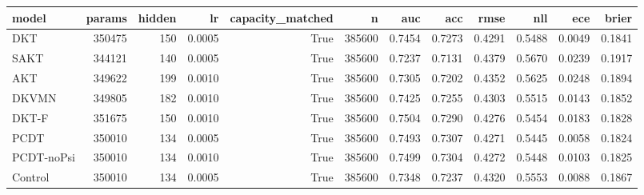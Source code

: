 \begin{tabular}{lrrrrrrrrrrr}
\toprule
model & params & hidden & lr & capacity\_matched & n & auc & acc & rmse & nll & ece & brier \\
\midrule
DKT & 350475 & 150 & 0.0005 & True & 385600 & 0.7454 & 0.7273 & 0.4291 & 0.5488 & 0.0049 & 0.1841 \\
SAKT & 344121 & 140 & 0.0005 & True & 385600 & 0.7237 & 0.7131 & 0.4379 & 0.5670 & 0.0239 & 0.1917 \\
AKT & 349622 & 199 & 0.0010 & True & 385600 & 0.7305 & 0.7202 & 0.4352 & 0.5625 & 0.0248 & 0.1894 \\
DKVMN & 349805 & 182 & 0.0010 & True & 385600 & 0.7425 & 0.7255 & 0.4303 & 0.5515 & 0.0143 & 0.1852 \\
DKT-F & 351675 & 150 & 0.0010 & True & 385600 & 0.7504 & 0.7290 & 0.4276 & 0.5454 & 0.0183 & 0.1828 \\
PCDT & 350010 & 134 & 0.0005 & True & 385600 & 0.7493 & 0.7307 & 0.4271 & 0.5445 & 0.0058 & 0.1824 \\
PCDT-noPsi & 350010 & 134 & 0.0010 & True & 385600 & 0.7499 & 0.7304 & 0.4272 & 0.5448 & 0.0103 & 0.1825 \\
Control & 350010 & 134 & 0.0005 & True & 385600 & 0.7348 & 0.7237 & 0.4320 & 0.5553 & 0.0088 & 0.1867 \\
\bottomrule
\end{tabular}
